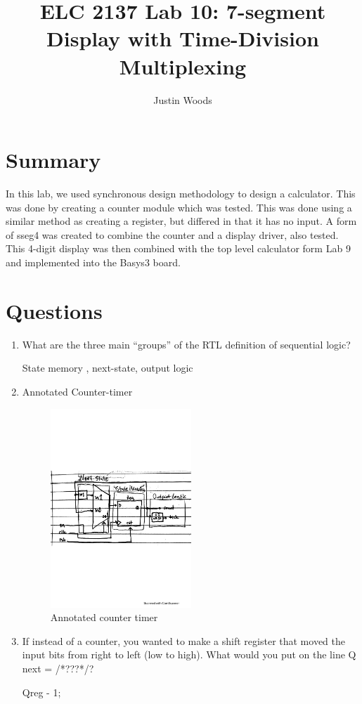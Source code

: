 \documentclass[11pt]{article}
\begin{document}
\title{ELC 2137 Lab 10: 7-segment Display with Time-Division Multiplexing}
\author{Justin Woods}
\maketitle

\section*{Summary}
In this lab, we used synchronous design methodology to design a calculator. This was done by creating a counter module which was tested. This was done using a similar method as creating a register, but differed in that it has no input. A form of sseg4 was created to combine the counter and a display driver, also tested. This 4-digit display was then combined with the top level calculator form Lab 9 and implemented into the Basys3 board.
\section*{Questions}

\begin{enumerate}
	\item What are the three main “groups” of the RTL deﬁnition of sequential logic?
	
	State memory , next-state, output logic
	
	\item Annotated Counter-timer
	\begin{figure}[ht]\centering
		\includegraphics[width=0.5\textwidth,trim =0 200 0 200,clip,angle=0,origin=c]{countertimer}
		\caption{Annotated counter timer}
		\label{fig:sim_with_table}
	\end{figure}

	\item If instead of a counter, you wanted to make a shift register that moved the input bits from right to left (low to high). What would you put on the line Q next = /*???*/?
	
	Qreg - 1;
\end{enumerate}
\clearpage
\end{document}
